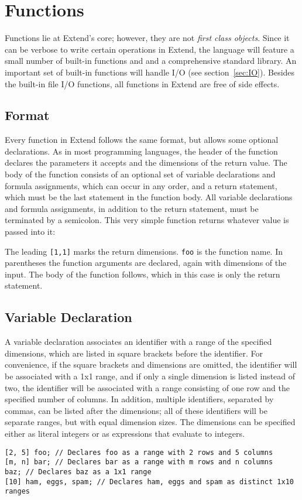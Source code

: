 \section{Functions}
\label{sec:Functions}
Functions lie at Extend's core; however, they are not \textit{first class objects}. Since it can be verbose to write certain operations in Extend, the language will feature a small number of built-in functions and and a comprehensive standard library. An important set of built-in functions will handle I/O (see section~\ref{sec:IO}). Besides the built-in file I/O functions, all functions in Extend are free of side effects.
\subsection{Format}
\label{sec:funcdecl}
Every function in Extend follows the same format, but allows some optional declarations. As in most programming languages, the header of the function declares the parameters it accepts and the dimensions of the return value. The body of the function consists of an optional set of variable declarations and formula assignments, which can occur in any order, and a return statement, which must be the last statement in the function body. All variable declarations and formula assignments, in addition to the return statement, must be terminated by a semicolon.
This very simple function returns whatever value is passed into it:

The leading \texttt{[1,1]} marks the return dimensions. \texttt{foo} is the function name. In parentheses the function arguments are declared, again with dimensions of the input. The body of the function follows, which in this case is only the return statement.
\subsection{Variable Declaration}
\label{sec:vardecl}
A variable declaration associates an identifier with a range of the specified dimensions, which are listed in square brackets before the identifier. For convenience, if the square brackets and dimensions are omitted, the identifier will be associated with a 1x1 range, and if only a single dimension is listed instead of two, the identifier will be associated with a range consisting of one row and the specified number of columns. In addition, multiple identifiers, separated by commas, can be listed after the dimensions; all of these identifiers will be separate ranges, but with equal dimension sizes. The dimensions can be specified either as literal integers or as expressions that evaluate to integers.
\begin{lstlisting}
[2, 5] foo; // Declares foo as a range with 2 rows and 5 columns
[m, n] bar; // Declares bar as a range with m rows and n columns
baz; // Declares baz as a 1x1 range
[10] ham, eggs, spam; // Declares ham, eggs and spam as distinct 1x10 ranges
\end{lstlisting}
